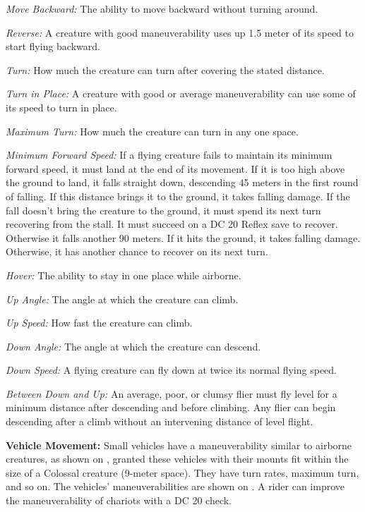 \textit{Move Backward:} The ability to move backward without turning around.

\textit{Reverse:} A creature with good maneuverability uses up 1.5 meter of its speed to start flying backward.

\textit{Turn:} How much the creature can turn after covering the stated distance.

\textit{Turn in Place:} A creature with good or average maneuverability can use some of its speed to turn in place.

\textit{Maximum Turn:} How much the creature can turn in any one space.

\textit{Minimum Forward Speed:} If a flying creature fails to maintain its minimum forward speed, it must land at the end of its movement. If it is too high above the ground to land, it falls straight down, descending 45 meters in the first round of falling. If this distance brings it to the ground, it takes falling damage. If the fall doesn't bring the creature to the ground, it must spend its next turn recovering from the stall. It must succeed on a DC 20 Reflex save to recover. Otherwise it falls another 90 meters. If it hits the ground, it takes falling damage. Otherwise, it has another chance to recover on its next turn.

\textit{Hover:} The ability to stay in one place while airborne.

\textit{Up Angle:} The angle at which the creature can climb.

\textit{Up Speed:} How fast the creature can climb.

\textit{Down Angle:} The angle at which the creature can descend.

\textit{Down Speed:} A flying creature can fly down at twice its normal flying speed.

\textit{Between Down and Up:} An average, poor, or clumsy flier must fly level for a minimum distance after descending and before climbing. Any flier can begin descending after a climb without an intervening distance of level flight.

\textbf{Vehicle Movement:} Small vehicles have a maneuverability similar to airborne creatures, as shown on , granted these vehicles with their mounts fit within the size of a Colossal creature (9-meter space). They have turn rates, maximum turn, and so on. The vehicles' maneuverabilities are shown on . A rider can improve the maneuverability of chariots with a DC 20  check.

